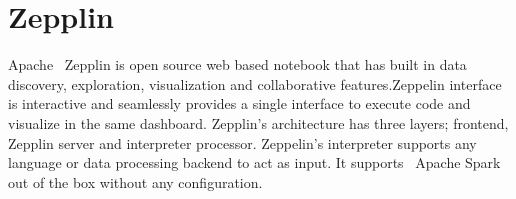 \section{Zepplin}

Apache~\cite{hid-sp18-413-Zepplin} Zepplin is open source web based notebook
that has built in data discovery, exploration, visualization and collaborative
features.Zeppelin interface is interactive and seamlessly provides a single
interface to execute code and visualize in the same dashboard. Zepplin’s
architecture has three layers; frontend, Zepplin server and interpreter
processor. Zeppelin’s interpreter supports any language or data processing
backend to act as input. It supports~\cite{hid-sp18-413-ApachexSpark} Apache
Spark out of the box without any configuration.
